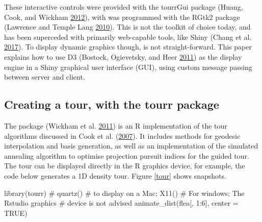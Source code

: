 These interactive controls were provided with the tourrGui package
(Huang, Cook, and Wickham \protect\hyperlink{ref-tourrGui}{2012}), with
was programmed with the RGtk2 package (Lawrence and Temple Lang
\protect\hyperlink{ref-RGtk2}{2010}). This is not the toolkit of choice
today, and has been superceded with primarily web-capable tools, like
Shiny (Chang et al. \protect\hyperlink{ref-shiny}{2017}). To display
dynamic graphics though, is not straight-forward. This paper explains
how to use D3 (Bostock, Ogievetsky, and Heer
\protect\hyperlink{ref-D3}{2011}) as the display engine in a Shiny
graphical user interface (GUI), using custom message passing between
server and client.

\hypertarget{creating-a-tour-with-the-tourr-package}{%
\subsection{Creating a tour, with the tourr
package}\label{creating-a-tour-with-the-tourr-package}}

The  package (Wickham et al.
\protect\hyperlink{ref-tourr}{2011}) is an R implementation of the tour
algorithms discussed in Cook et al.
(\protect\hyperlink{ref-gt_pp_mc}{2007}). It includes methods for
geodesic interpolation and basis generation, as well as an
implementation of the simulated annealing algorithm to optimise
projection pursuit indices for the guided tour. The tour can be
displayed directly in the R graphics device, for example, the code below
generates a 1D density tour. Figure \ref{tour} shows snapshots.

\begin{Schunk}
\begin{Sinput}
library(tourr)
# quartz() # to display on a Mac; X11() # For windows; The Rstudio graphics
# device is not advised
animate_dist(flea[, 1:6], center = TRUE)
\end{Sinput}
\end{Schunk}

